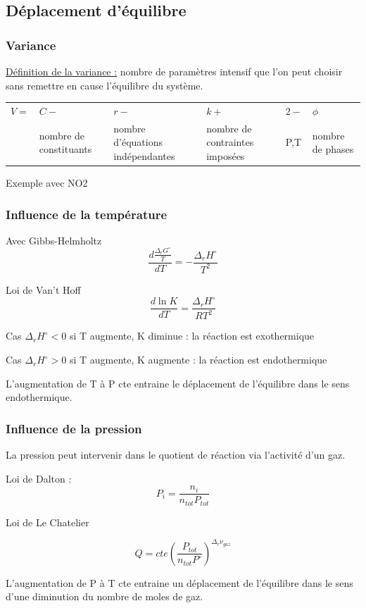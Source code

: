 \documentclass{article}%
\begin{document}
\subsection{Déplacement d’équilibre}
\subsubsection{Variance}

\underline{Définition de la variance :} nombre de paramètres intensif que l'on peut choisir sans remettre en cause l'équilibre du système.

\begin{tabular}{llllll}
$V=$&$C-$&$r-$&$k+$&$2-$&$\phi$\\
&nombre de constituants & nombre d'équations indépendantes& nombre de contraintes imposées & P,T & nombre de phases\\
\end{tabular}

Exemple avec NO2

\subsubsection{Influence de la température}

Avec Gibbs-Helmholtz \[\frac{d\frac{\Delta_r G^\circ}{T}}{dT}=-\frac{\Delta_r H^\circ}{T^2}\]

Loi de Van’t Hoff \[\frac{d\ln K}{dT}=\frac{\Delta_r H^\circ}{RT^2}\]

Cas $\Delta_r H^\circ<0$ si T augmente, K diminue : la réaction est exothermique

Cas $\Delta_r H^\circ>0$ si T augmente, K augmente : la réaction est endothermique

L'augmentation de T à P cte entraine le déplacement de l'équilibre dans le sens endothermique.

\subsubsection{Influence de la pression}
La pression peut intervenir dans le quotient de réaction via l'activité d'un gaz.

Loi de Dalton : \[P_i=\frac{n_i}{n_{tot}P_{tot}}\]

Loi de Le Chatelier 

\[Q= cte \left( \frac{P_{tot}}{n_{tot}P^\circ} \right)^{\Delta_r \nu_{gaz}}\]

L'augmentation de P à T cte entraine un déplacement de l'équilibre dans le sens d'une diminution du nombre de moles de gaz.
\end{document}
